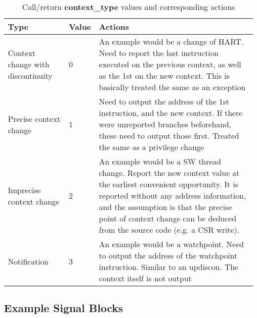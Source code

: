 \begin{table}[htp]
    \centering
    \caption{Call/return \textbf{context\_type} values and corresponding actions}
    \label{tab:context-type}
    \begin{tabulary}{\textwidth}{|l|l|p{80mm}|}
        \hline
        \textbf {Type} & \textbf {Value} & \textbf {Actions} \\
        \hline
        Context change with discontinuity & 0 &  An example would be a change of HART.\newline
        Need to report the last instruction executed on the previous context, as well as the 1st on the new context.\newline
        This is basically treated the same as an exception\\
        \hline
        Precise context change & 1 & Need to output the address of the 1st instruction, and the new context.\newline
        If there were unreported branches beforehand, these need to output those first.\newline
        Treated the same as a privilege change\\
        \hline
        Imprecise context change & 2 & An example would be a SW thread change.\newline
        Report the new context value at the earliest convenient opportunity.\newline
        It is reported without any address information, and the assumption is that the precise point of context change can be deduced from the source code (e.g. a CSR write). \\
        \hline
        Notification & 3 & An example would be a watchpoint.\newline
        Need to output the address of the watchpoint instruction.\newline
        Similar to an updiscon.\newline
        The context itself is not output\\
        \hline
    \end{tabulary}
\end{table}

\subsection {Example Signal Blocks}

